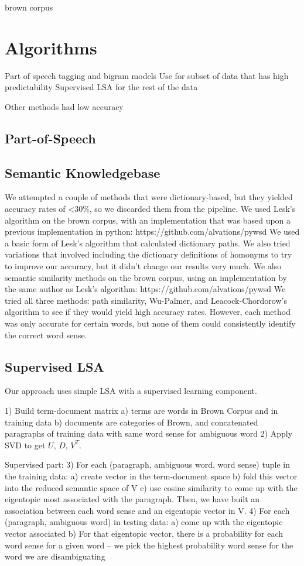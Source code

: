 \documentclass[10pt, letterpaper]{article}
\begin{document}
	brown corpus

	\section{Algorithms}
	 Part of speech tagging and bigram models
 	 Use for subset of data that has high predictability
 	 Supervised LSA for the rest of the data

 	 Other methods had low accuracy 
 	\subsection{Part-of-Speech}
 	\subsection{Semantic Knowledgebase}
        We attempted a couple of methods that were dictionary-based, but they yielded accuracy rates of <30\%, so we discarded them from the pipeline.
        We used Lesk's algorithm on the brown corpus, with an implementation that was based upon a previous implementation in python: https://github.com/alvations/pywsd We used a basic form of Lesk's algorithm that calculated dictionary paths. We also tried variations that involved including the dictionary definitions of homonyms to try to improve our accuracy, but it didn't change our results very much.
        We also semantic similarity methods on the brown corpus, using an implementation by the same author as Lesk's algorithm: https://github.com/alvations/pywsd  We tried all three methods: path similarity, Wu-Palmer, and Leacock-Chordorow's algorithm to see if they would yield high accuracy rates. However, each method was only accurate for certain words, but none of them could consistently identify the correct word sense.
	\subsection{Supervised LSA}
	Our approach uses simple LSA with a supervised learning component. 

	1) Build term-document matrix 
		a) terms are words in Brown Corpus and in training data
		b) documents are categories of Brown, and concatenated paragraphs of training data with same word sense for ambiguous word
	2) Apply SVD to get $U$, $D$, $V^T$.

	Supervised part: 
	3) For each (paragraph, ambiguous word, word sense) tuple in the training data:
		a) create vector in the term-document space
		b) fold this vector into the reduced semantic space of V
		c) use cosine similarity to come up with the eigentopic most associated with the paragraph. 
	Then, we have built an association between each word sense and an eigentopic vector in V. 
	4) For each (paragraph, ambiguous word) in testing data:
		a) come up with the eigentopic vector associated
		b) For that eigentopic vector, there is a probability for each word sense for a given word -- we pick the highest probability word sense for the word we are disambiguating
\end{document}
